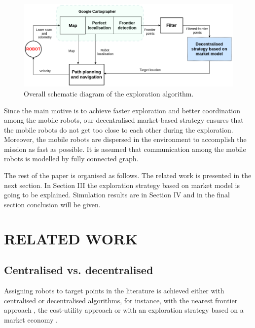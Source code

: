 \documentclass[letterpaper, 10 pt, conference]{ieeeconf}  %
\begin{document}
\begin{figure}[t]
    \centering\includegraphics[width=1.0\columnwidth]{diagram_exploration.png}
	\caption{Overall schematic diagram of the exploration algorithm.}
   \label{fig:exploration-strategy}
\end{figure}

Since the main motive is to achieve faster exploration and better coordination among the mobile robots, our decentralised market-based strategy ensures that the mobile robots do not get too close to each other during the exploration. Moreover, the mobile robots are dispersed in the environment to accomplish the mission as fast as possible. It is assumed that communication among the mobile robots is modelled by fully connected graph.

The rest of the paper is organised as follows. The related work is presented in the next section. In Section III the exploration strategy based on market model is going to be explained. Simulation results are in Section IV and in the final section conclusion will be given.

\section{RELATED WORK}

 \subsection{Centralised vs. decentralised}
Assigning robots to target points in the literature is achieved either with centralised or decentralised algorithms, for instance, with the nearest frontier approach \cite{Yamauchi}, the cost-utility approach \cite{burgard} or  with an exploration strategy based on a market economy \cite{market-economy}. 
\end{document}

